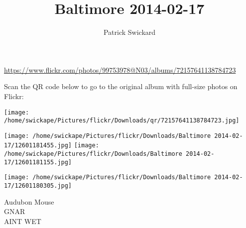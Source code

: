 \documentclass[10pt,letterpaper]{article}
\title{Baltimore 2014-02-17}
\author{Patrick Swickard}
\date{}
\begin{document}
\maketitle

\url{https://www.flickr.com/photos/99753978@N03/albums/72157641138784723}

Scan the QR code below to go to the original album with full-size photos on Flickr:

\texttt{[image: /home/swickape/Pictures/flickr/Downloads/qr/72157641138784723.jpg]}
\pagebreak

\texttt{[image: /home/swickape/Pictures/flickr/Downloads/Baltimore 2014-02-17/12601181455.jpg]}
\texttt{[image: /home/swickape/Pictures/flickr/Downloads/Baltimore 2014-02-17/12601181155.jpg]}

\texttt{[image: /home/swickape/Pictures/flickr/Downloads/Baltimore 2014-02-17/12601180305.jpg]}

Audubon Mouse\\
GNAR\\
AINT WET
\pagebreak
\end{document}
